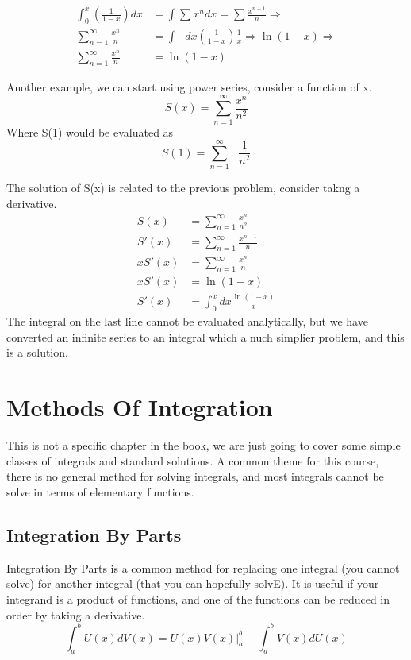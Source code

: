 \documentclass{article}
\newcommand{\be}{\begin{equation}}
\newcommand{\ee}{\end{equation}}
\begin{document}
\be
\begin{split}
	\int_{0}^{x} \left(\frac{1}{1-x}\right) dx &= \int \sum x^n dx = \sum \frac{x^{n+1}}{n} \Rightarrow \\
	\sum_{n=1}^\infty \frac{x^n}{n} &= \int \text{ } dx \left(\frac{1}{1-x}\right) \frac{1}{x} \Rightarrow \ln(1-x) \Rightarrow\\
	\sum_{n=1}^\infty \frac{x^n}{n} &= \ln(1-x)
\end{split}
\ee

Another example, we can start using power series, consider a function of x.
\be
S(x) = \sum_{n=1}^\infty \frac{x^n}{n^2}
\ee
Where S(1) would be evaluated as
\be
S(1) = \sum_{n=1}^\infty \text{ }\frac{1}{n^2}
\ee

The solution of S(x) is related to the previous problem, consider takng a derivative.
\be
\begin{split}
	S(x) &= \sum_{n=1}^\infty \frac{x^n}{n^2}\\
	S'(x) &= \sum_{n=1}^\infty \frac{x^{n-1}}{n}\\
	x S'(x) &= \sum_{n=1}^\infty \frac{x^{n}}{n}\\
	x S'(x) &= \ln(1-x)\\
	S'(x) &= \int_0^x dx \frac{\ln(1-x)}{x}
\end{split}
\ee
The integral on the last line cannot be evaluated analytically, but we have converted an infinite series to an integral which a nuch simplier problem, and this is a solution.

\section*{Methods Of Integration}
This is not a specific chapter in the book, we are just going to cover some simple classes of integrals and standard solutions.
A common theme for this course, there is no general method for solving integrals, and most integrals cannot be solve in terms of elementary functions.

\subsection*{Integration By Parts}
Integration By Parts is a common method for replacing one integral (you cannot solve) for another integral (that you can hopefully solvE).
It is useful if your integrand is a product of functions, and one of the functions can be reduced in order by taking a derivative.
\be
\int_a^b U(x) dV(x) = U(x) V(x) \bigg | _a^b - \int_a^b V(x) dU(x)
\ee
\end{document}
